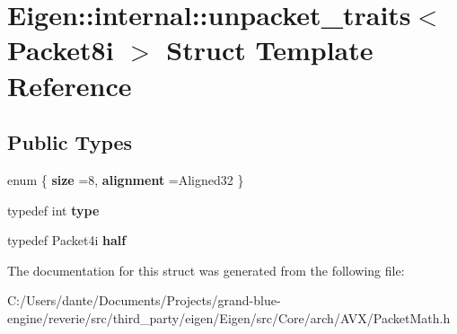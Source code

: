 \hypertarget{struct_eigen_1_1internal_1_1unpacket__traits_3_01_packet8i_01_4}{}\section{Eigen\+::internal\+::unpacket\+\_\+traits$<$ Packet8i $>$ Struct Template Reference}
\label{struct_eigen_1_1internal_1_1unpacket__traits_3_01_packet8i_01_4}
\subsection*{Public Types}
\begin{DoxyCompactItemize}
\item 
\mbox{\label{struct_eigen_1_1internal_1_1unpacket__traits_3_01_packet8i_01_4_a6cda5ae4330c645b46d35234fd8f3fbd}} 
enum \{ {\bfseries size} =8, 
{\bfseries alignment} =Aligned32
 \}
\item 
\mbox{\label{struct_eigen_1_1internal_1_1unpacket__traits_3_01_packet8i_01_4_ae65a6864c3908f78ea40d59c580392ff}} 
typedef int {\bfseries type}
\item 
\mbox{\label{struct_eigen_1_1internal_1_1unpacket__traits_3_01_packet8i_01_4_a90ccb43bd0d41a92680f391bae3b04d5}} 
typedef Packet4i {\bfseries half}
\end{DoxyCompactItemize}


The documentation for this struct was generated from the following file\+:\begin{DoxyCompactItemize}
\item 
C\+:/\+Users/dante/\+Documents/\+Projects/grand-\/blue-\/engine/reverie/src/third\+\_\+party/eigen/\+Eigen/src/\+Core/arch/\+A\+V\+X/Packet\+Math.\+h\end{DoxyCompactItemize}
